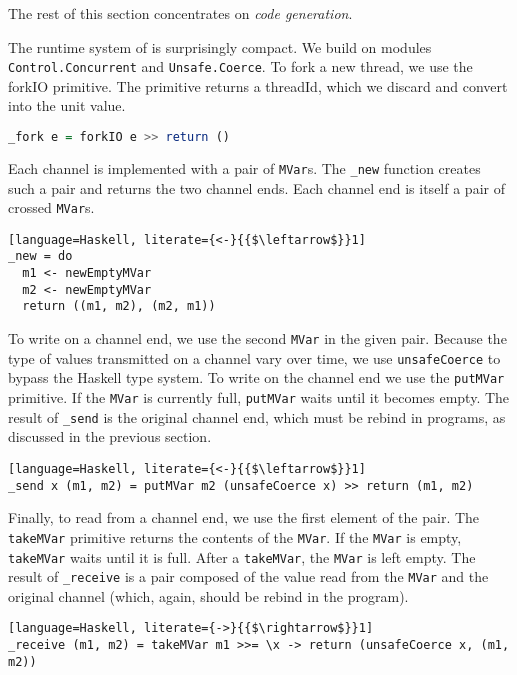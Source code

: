 The rest of this section concentrates on \emph{code generation}.

The runtime system of \freest{} is surprisingly compact. We build on
modules \lstinline|Control.Concurrent| and
\lstinline|Unsafe.Coerce|.
%
To fork a new thread, we use the forkIO primitive. The primitive
returns a threadId, which we discard and convert into the unit value.
%
\begin{lstlisting}[language=Haskell]
_fork e = forkIO e >> return ()
\end{lstlisting}

Each channel is implemented with a pair of \lstinline|MVar|s. The
\lstinline|_new| function creates such a pair and returns the two
channel ends. Each channel end is itself a pair of crossed
\lstinline|MVar|s.
%
\begin{lstlisting}[language=Haskell, literate={<-}{{$\leftarrow$}}1]
_new = do
  m1 <- newEmptyMVar
  m2 <- newEmptyMVar
  return ((m1, m2), (m2, m1))
\end{lstlisting}

To write on a channel end, we use the second \lstinline|MVar| in the
given pair. Because the type of values transmitted on a channel vary
over time, we use \lstinline|unsafeCoerce| to bypass the Haskell type
system. To write on the channel end we use the \lstinline|putMVar|
primitive. If the \lstinline|MVar| is currently full,
\lstinline|putMVar| waits until it becomes empty.  The result of
\lstinline|_send| is the original channel end, which must be rebind in
programs, as discussed in the previous section.
%
\begin{lstlisting}[language=Haskell, literate={<-}{{$\leftarrow$}}1]
_send x (m1, m2) = putMVar m2 (unsafeCoerce x) >> return (m1, m2)
\end{lstlisting}

Finally, to read from a channel end, we use the first element of the
pair. The \lstinline|takeMVar| primitive returns the contents of the
\lstinline|MVar|. If the \lstinline|MVar| is empty,
\lstinline|takeMVar| waits until it is full. After a
\lstinline|takeMVar|, the \lstinline|MVar| is left empty. The result
of \lstinline|_receive| is a pair composed of the value read from the
\lstinline|MVar| and the original channel (which, again, should be
rebind in the program).
%
\begin{lstlisting}[language=Haskell, literate={->}{{$\rightarrow$}}1]
_receive (m1, m2) = takeMVar m1 >>= \x -> return (unsafeCoerce x, (m1, m2))
\end{lstlisting}


